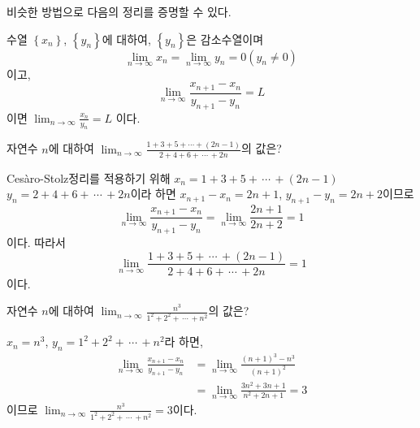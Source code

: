 \documentclass[11pt, a4paper]{book}
\begin{document}
\vspace{1em}
  비슷한 방법으로 다음의 정리를 증명할 수 있다.
\begin{theorem}
	수열 $\left\{x_{n}\right\}$, $\left\{y_{n}\right\}$에 대하여, $\left\{y_{n}\right\}$은 감소수열이며
	\begin{equation*}
	 \lim_{n\to\infty}x_{n}=\lim_{n\to\infty}y_{n}= 0(y_{n}\ne 0)
	\end{equation*}
이고,
	\begin{equation*}
			\lim_{n\to\infty}\frac{x_{n+1}-x_{n}}{y_{n+1}-y_{n}}=L
	\end{equation*}
	이면 $\displaystyle \lim_{n\to\infty}\frac{x_{n}}{y_{n}}=L$ 이다.
\end{theorem}
\vspace{1em}
\begin{example}
 자연수 $n$에 대하여 $\displaystyle \lim_{n\to\infty}\frac{1+3+ 5+\cdots +(2n-1)}{2+4+6+\,\cdots \, + 2n}$의 값은?
\begin{solution}
Ces\`{a}ro-Stolz정리를 적용하기 위해 $x_{n}=1+3+5+\, \cdots \, +(2n-1)$
$y_{n}=2+4+6+\, \cdots \, + 2n$이라 하면 $x_{n+1}-x_{n}=2n+1$, $y_{n+1}-y_{n}=2n+2$이므로 
\begin{equation*}
\lim_{n\to\infty}\frac{x_{n+1}-x_{n}}{y_{n+1}-y_{n}}=\lim_{n\to\infty}\frac{2n+1}{2n+2}=1
\end{equation*}
이다. 따라서  
\[
\lim_{n\to\infty}\frac{1+3+ 5+\,\cdots \, +(2n-1)}{2+4+6+\, \cdots \, + 2n}=1
\]
이다.
\end{solution}
\end{example}
\vspace{1em}
\begin{example}
	자연수 $n$에 대하여 $\displaystyle \lim_{n\to\infty}\frac{n^{3}}{1^{2}+2^{2}+\, \cdots\,  + n^{2}}$의 값은?
\begin{solution}
	 $x_{n}=n^{3}$, $y_{n}=1^{2}+2^{2}+\,\cdots \, + n^{2}$라 하면, 
	\begin{align*}
	\lim_{n\to\infty}\frac{x_{n+1}-x_{n}}{y_{n+1}-y_{n}}&=\lim_{n\to\infty}\frac{(n+1)^{3}-n^{3}}{(n+1)^{2}}\\
	&=\lim_{n\to\infty}\frac{3n^{2}+3n+1}{n^{2}+2n+1}=3
	\end{align*}
	이므로 $\displaystyle \lim_{n\to\infty}\frac{n^{3}}{1^{2}+2^{2}+\, \cdots \,+ n^{2}}=3$이다.
\end{solution}
\end{example}
\vspace{1em}
\end{document}
